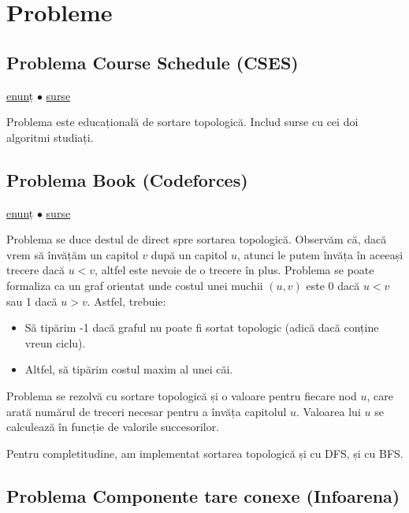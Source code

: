 \documentclass[../main.tex]{subfiles}
\begin{document}
\section{Probleme}

\subsection{Problema Course Schedule (CSES)}
\label{problem:course-schedule}

\href{https://cses.fi/problemset/task/1679}{enunț}
$\bullet$
\hyperref[code:course-schedule]{surse}

Problema este educațională de sortare topologică. Includ surse cu cei doi algoritmi studiați.

\subsection{Problema Book (Codeforces)}
\label{problem:book}

\href{https://codeforces.com/contest/1573/problem/C}{enunț}
$\bullet$
\hyperref[code:book]{surse}

Problema se duce destul de direct spre sortarea topologică. Observăm că, dacă vrem să învățăm un capitol $v$ după un capitol $u$, atunci le putem învăța în aceeași trecere dacă $u < v$, altfel este nevoie de o trecere în plus. Problema se poate formaliza ca un graf orientat unde costul unei muchii $(u,v)$ este 0 dacă $u < v$ sau 1 dacă $u > v$. Astfel, trebuie:

\begin{itemize}
  \item Să tipărim -1 dacă graful nu poate fi sortat topologic (adică dacă conține vreun ciclu).
  \item Altfel, să tipărim costul maxim al unei căi.
\end{itemize}

Problema se rezolvă cu sortare topologică și o valoare pentru fiecare nod $u$, care arată numărul de treceri necesar pentru a învăța capitolul $u$. Valoarea lui $u$ se calculează în funcție de valorile succesorilor.

Pentru completitudine, am implementat sortarea topologică și cu DFS, și cu BFS.

\subsection{Problema Componente tare conexe (Infoarena)}
\label{problem:ctc}
\end{document}

